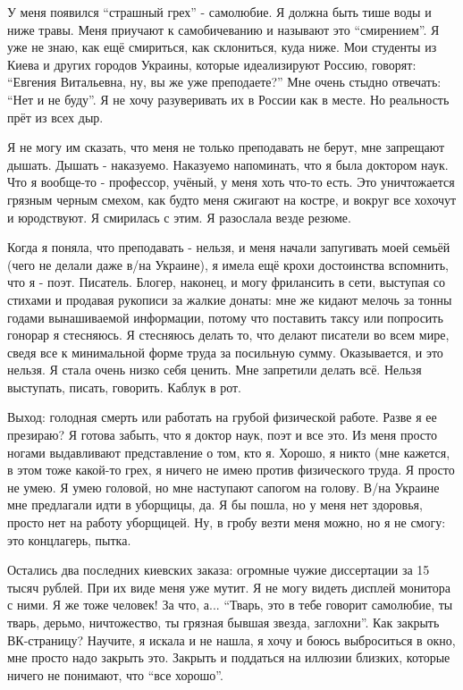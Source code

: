 У меня появился \enquote{страшный грех} - самолюбие. Я должна быть тише воды и ниже
травы. Меня приучают к самобичеванию и называют это \enquote{смирением}. Я уже не знаю,
как ещё смириться, как склониться, куда ниже. Мои студенты из Киева и других
городов Украины, которые идеализируют Россию, говорят: \enquote{Евгения Витальевна, ну,
вы же уже преподаете?} Мне очень стыдно отвечать: \enquote{Нет и не буду}. Я не хочу
разуверивать их в России как в месте. Но реальность прёт из всех дыр.

Я не могу им сказать, что меня не только преподавать не берут, мне запрещают
дышать. Дышать - наказуемо. Наказуемо напоминать, что я была доктором наук. Что
я вообще-то - профессор, учёный, у меня хоть что-то есть. Это уничтожается
грязным черным смехом, как будто меня сжигают на костре, и вокруг все хохочут и
юродствуют. Я смирилась с этим. Я разослала везде резюме. 

Когда я поняла, что преподавать - нельзя, и меня начали запугивать моей семьёй
(чего не делали даже в/на Украине), я имела ещё крохи достоинства вспомнить,
что я - поэт. Писатель. Блогер, наконец, и могу фрилансить в сети, выступая со
стихами и продавая рукописи за жалкие донаты: мне же кидают мелочь за тонны
годами вынашиваемой информации, потому что поставить таксу или попросить
гонорар я стесняюсь. Я стесняюсь делать то, что делают писатели во всем мире,
сведя все к минимальной форме труда за посильную сумму. Оказывается, и это
нельзя.  Я стала очень низко себя ценить. Мне запретили делать всё. Нельзя
выступать, писать, говорить. Каблук в рот.

Выход: голодная смерть или работать на грубой физической работе. Разве я ее
презираю? Я готова забыть, что я доктор наук, поэт и все это. Из меня просто
ногами выдавливают представление о том, кто я. Хорошо, я никто (мне кажется, в
этом тоже какой-то грех, я ничего не имею против физического труда. Я просто не
умею. Я умею головой, но мне наступают сапогом на голову. В/на Украине мне
предлагали идти в уборщицы, да. Я бы пошла, но у меня нет здоровья, просто нет
на работу уборщицей. Ну, в гробу везти меня можно, но я не смогу: это
концлагерь, пытка.

Остались два последних киевских заказа: огромные чужие диссертации за 15 тысяч
рублей. При их виде меня уже мутит. Я не могу видеть дисплей монитора с ними. Я
же тоже человек! За что, а... \enquote{Тварь, это в тебе говорит самолюбие, ты
тварь, дерьмо, ничтожество, ты грязная бывшая звезда, заглохни}. Как закрыть
ВК-страницу? Научите, я искала и не нашла, я хочу и боюсь выброситься в окно,
мне просто надо закрыть это. Закрыть и поддаться на иллюзии близких, которые
ничего не понимают, что \enquote{все хорошо}.

